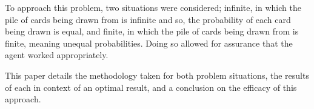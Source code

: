 To approach this problem, two situations were considered; infinite, in which the pile of cards being drawn from is infinite and so, the probability of each card being drawn is equal, and finite, in which the pile of cards being drawn from is finite, meaning unequal probabilities. Doing so allowed for assurance that the agent worked appropriately. 

This paper details the methodology taken for both problem situations, the results of each in context of an optimal result, and a conclusion on the efficacy of this approach.

